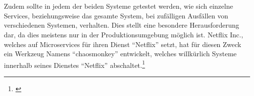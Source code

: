 \\\\
Zudem sollte in jedem der beiden Systeme getestet werden, wie sich einzelne Services, beziehungsweise das gesamte System, bei zufälligen Ausfällen von verschiedenen Systemen, verhalten. Dies stellt eine besondere Herausforderung dar, da dies meistens nur in der Produktionsumgebung möglich ist. Netflix Inc., welches auf Microservices für ihren Dienst "`Netflix"' setzt, hat für diesen Zweck ein Werkzeug Namens "`chaosmonkey"' entwickelt, welches willkürlich Systeme innerhalb seines Dienstes "`Netflix"' abschaltet.\footnote{\cite{chaosmonkey}}
